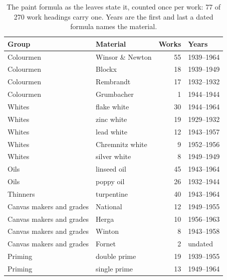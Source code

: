 \begin{table}[htbp]\centering\small
\caption{The paint formula as the leaves state it, counted once per work: 77 of 270 work headings carry one. Years are the first and last a dated formula names the material.}\label{tab:materials}
\begin{tabular}{llrl}\toprule Group & Material & Works & Years\\\midrule
Colourmen & Winsor \& Newton & 55 & 1939--1964\\
Colourmen & Blockx & 18 & 1939--1949\\
Colourmen & Rembrandt & 17 & 1932--1932\\
Colourmen & Grumbacher & 1 & 1944--1944\\
Whites & flake white & 30 & 1944--1964\\
Whites & zinc white & 19 & 1929--1932\\
Whites & lead white & 12 & 1943--1957\\
Whites & Chremnitz white & 9 & 1952--1956\\
Whites & silver white & 8 & 1949--1949\\
Oils & linseed oil & 45 & 1943--1964\\
Oils & poppy oil & 26 & 1932--1944\\
Thinners & turpentine & 40 & 1943--1964\\
Canvas makers and grades & National & 12 & 1949--1955\\
Canvas makers and grades & Herga & 10 & 1956--1963\\
Canvas makers and grades & Winton & 8 & 1943--1958\\
Canvas makers and grades & Fornet & 2 & undated\\
Priming & double prime & 19 & 1939--1955\\
Priming & single prime & 13 & 1949--1964\\
\bottomrule\end{tabular}\end{table}

